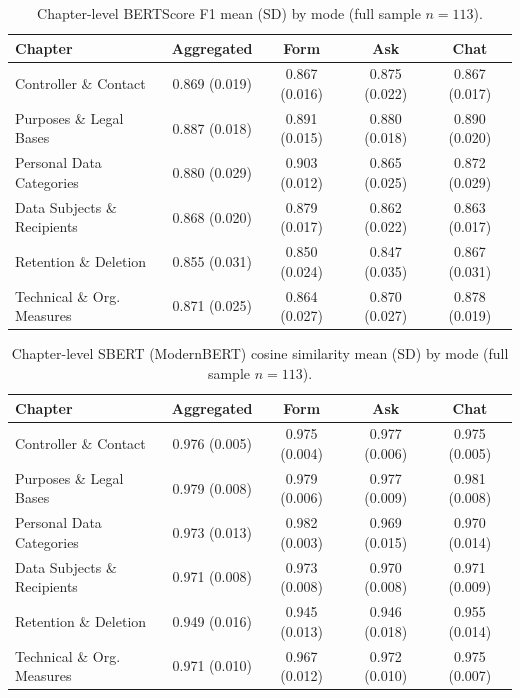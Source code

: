 \begin{table}[htbp]
\centering
\caption{Chapter-level BERTScore F1 mean (SD) by mode (full sample
$n = 113$).}
\label{tab:nlp-chapter-bertf1}
\small
\begin{tabular}{@{}l c c c c@{}}
\toprule
Chapter & Aggregated & Form & Ask & Chat \\
\midrule
Controller \& Contact         & 0.869 (0.019) & 0.867 (0.016) & 0.875 (0.022) & 0.867 (0.017) \\
Purposes \& Legal Bases       & 0.887 (0.018) & 0.891 (0.015) & 0.880 (0.018) & 0.890 (0.020) \\
Personal Data Categories      & 0.880 (0.029) & 0.903 (0.012) & 0.865 (0.025) & 0.872 (0.029) \\
Data Subjects \& Recipients   & 0.868 (0.020) & 0.879 (0.017) & 0.862 (0.022) & 0.863 (0.017) \\
Retention \& Deletion         & 0.855 (0.031) & 0.850 (0.024) & 0.847 (0.035) & 0.867 (0.031) \\
Technical \& Org. Measures    & 0.871 (0.025) & 0.864 (0.027) & 0.870 (0.027) & 0.878 (0.019) \\
\bottomrule
\end{tabular}
\end{table}

\begin{table}[htbp]
\centering
\caption{Chapter-level SBERT (ModernBERT) cosine similarity mean
(SD) by mode (full sample $n = 113$).}
\label{tab:nlp-chapter-sbert}
\small
\begin{tabular}{@{}l c c c c@{}}
\toprule
Chapter & Aggregated & Form & Ask & Chat \\
\midrule
Controller \& Contact         & 0.976 (0.005) & 0.975 (0.004) & 0.977 (0.006) & 0.975 (0.005) \\
Purposes \& Legal Bases       & 0.979 (0.008) & 0.979 (0.006) & 0.977 (0.009) & 0.981 (0.008) \\
Personal Data Categories      & 0.973 (0.013) & 0.982 (0.003) & 0.969 (0.015) & 0.970 (0.014) \\
Data Subjects \& Recipients   & 0.971 (0.008) & 0.973 (0.008) & 0.970 (0.008) & 0.971 (0.009) \\
Retention \& Deletion         & 0.949 (0.016) & 0.945 (0.013) & 0.946 (0.018) & 0.955 (0.014) \\
Technical \& Org. Measures    & 0.971 (0.010) & 0.967 (0.012) & 0.972 (0.010) & 0.975 (0.007) \\
\bottomrule
\end{tabular}
\end{table}

